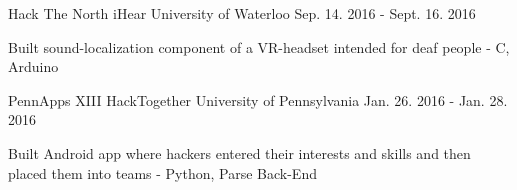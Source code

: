 \begin{cventries}
  \cventry
    {Hack The North}
    {iHear}
    {University of Waterloo}
    {Sep. 14. 2016 - Sept. 16. 2016}
    {
      \begin{cvitems}
        \item {Built sound-localization component of a VR-headset intended for deaf people - C, Arduino}
      \end{cvitems}
    }
   \cventry
    {PennApps XIII}
    {HackTogether}
    {University of Pennsylvania}
    {Jan. 26. 2016 - Jan. 28. 2016}
    {
      \begin{cvitems}
        \item {Built Android app where hackers entered their interests and skills and then placed them into teams - Python, Parse Back-End}
      \end{cvitems}
    }
    
\end{cventries}
